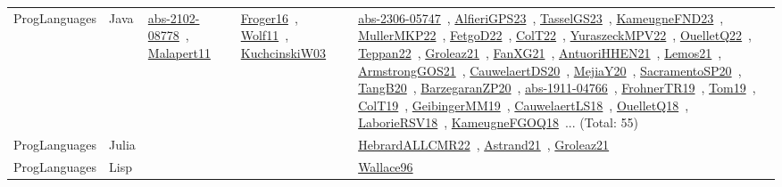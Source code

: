 {\begin{longtable}{lp{3cm}>{\raggedright\arraybackslash}p{6cm}>{\raggedright\arraybackslash}p{6cm}>{\raggedright\arraybackslash}p{8cm}}
ProgLanguages & Java & \href{works/abs-2102-08778.pdf}{abs-2102-08778}~\cite{abs-2102-08778}, \href{works/Malapert11.pdf}{Malapert11}~\cite{Malapert11} & \href{works/Froger16.pdf}{Froger16}~\cite{Froger16}, \href{works/Wolf11.pdf}{Wolf11}~\cite{Wolf11}, \href{works/KuchcinskiW03.pdf}{KuchcinskiW03}~\cite{KuchcinskiW03} & \href{works/abs-2306-05747.pdf}{abs-2306-05747}~\cite{abs-2306-05747}, \href{works/AlfieriGPS23.pdf}{AlfieriGPS23}~\cite{AlfieriGPS23}, \href{works/TasselGS23.pdf}{TasselGS23}~\cite{TasselGS23}, \href{works/KameugneFND23.pdf}{KameugneFND23}~\cite{KameugneFND23}, \href{works/MullerMKP22.pdf}{MullerMKP22}~\cite{MullerMKP22}, \href{works/FetgoD22.pdf}{FetgoD22}~\cite{FetgoD22}, \href{works/ColT22.pdf}{ColT22}~\cite{ColT22}, \href{works/YuraszeckMPV22.pdf}{YuraszeckMPV22}~\cite{YuraszeckMPV22}, \href{works/OuelletQ22.pdf}{OuelletQ22}~\cite{OuelletQ22}, \href{works/Teppan22.pdf}{Teppan22}~\cite{Teppan22}, \href{works/Groleaz21.pdf}{Groleaz21}~\cite{Groleaz21}, \href{works/FanXG21.pdf}{FanXG21}~\cite{FanXG21}, \href{works/AntuoriHHEN21.pdf}{AntuoriHHEN21}~\cite{AntuoriHHEN21}, \href{works/Lemos21.pdf}{Lemos21}~\cite{Lemos21}, \href{works/ArmstrongGOS21.pdf}{ArmstrongGOS21}~\cite{ArmstrongGOS21}, \href{works/CauwelaertDS20.pdf}{CauwelaertDS20}~\cite{CauwelaertDS20}, \href{works/MejiaY20.pdf}{MejiaY20}~\cite{MejiaY20}, \href{works/SacramentoSP20.pdf}{SacramentoSP20}~\cite{SacramentoSP20}, \href{works/TangB20.pdf}{TangB20}~\cite{TangB20}, \href{works/BarzegaranZP20.pdf}{BarzegaranZP20}~\cite{BarzegaranZP20}, \href{works/abs-1911-04766.pdf}{abs-1911-04766}~\cite{abs-1911-04766}, \href{works/FrohnerTR19.pdf}{FrohnerTR19}~\cite{FrohnerTR19}, \href{works/Tom19.pdf}{Tom19}~\cite{Tom19}, \href{works/ColT19.pdf}{ColT19}~\cite{ColT19}, \href{works/GeibingerMM19.pdf}{GeibingerMM19}~\cite{GeibingerMM19}, \href{works/CauwelaertLS18.pdf}{CauwelaertLS18}~\cite{CauwelaertLS18}, \href{works/OuelletQ18.pdf}{OuelletQ18}~\cite{OuelletQ18}, \href{works/LaborieRSV18.pdf}{LaborieRSV18}~\cite{LaborieRSV18}, \href{works/KameugneFGOQ18.pdf}{KameugneFGOQ18}~\cite{KameugneFGOQ18}... (Total: 55)\\
ProgLanguages & Julia &  &  & \href{works/HebrardALLCMR22.pdf}{HebrardALLCMR22}~\cite{HebrardALLCMR22}, \href{works/Astrand21.pdf}{Astrand21}~\cite{Astrand21}, \href{works/Groleaz21.pdf}{Groleaz21}~\cite{Groleaz21}\\
ProgLanguages & Lisp &  &  & \href{works/Wallace96.pdf}{Wallace96}~\cite{Wallace96}\\

\end{longtable}}
